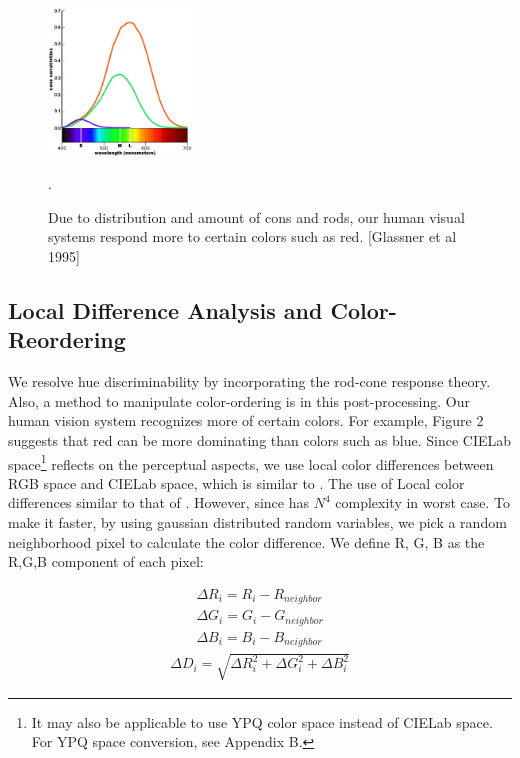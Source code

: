 \documentclass{article}
\begin{document}
\begin{figure}[h]
\centering
 \includegraphics[width=1.5in]{rodconecolors.jpg}
\caption{Due to distribution and amount of cons and rods, our human visual systems respond more to certain colors such as red. [Glassner et al 1995]}.

\label{fig:rodconeresponses}
\end{figure}

\subsection{Local Difference Analysis and Color-Reordering}
 We resolve hue discriminability by incorporating the rod-cone response theory.  Also, a method to manipulate color-ordering is in this post-processing. Our human vision system recognizes more of certain colors. For example, Figure 2 suggests that red can be more dominating than colors such as blue. Since CIELab space\footnote{It may also be applicable to use YPQ color space instead of CIELab space. For YPQ space conversion, see Appendix B.} reflects on the perceptual aspects, we use local color differences between RGB space and CIELab space, which is similar to \cite{journals/pr/GrundlandD07}. The use of Local color differences similar to that of \cite{Gooch05color2gray:salience-preserving}. However, since \cite{Gooch05color2gray:salience-preserving} has $N^4$ complexity in worst case. To make it faster, by using gaussian distributed random variables, we pick a random neighborhood pixel to calculate the color difference. We define R, G, B as the R,G,B component of each pixel:

\begin{eqnarray}
\Delta R_i=R_i-R_{neighbor} \\
\Delta G_i=G_i-G_{neighbor} \\
\Delta B_i=B_i-B_{neighbor}
\end{eqnarray}
\begin{eqnarray}
\Delta D_i = \sqrt{ \Delta R_i^2 + \Delta G_i^2 + \Delta B_i^2 }
\end{eqnarray}
\end{document}
